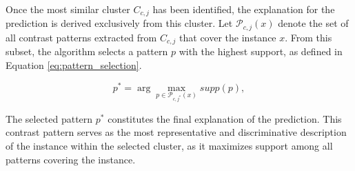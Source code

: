 {       Once the most similar cluster $C_{c,j}$ has been identified, the explanation for the prediction is derived exclusively from this cluster. Let $\mathcal{P}_{c,j}(x)$ denote the set of all contrast patterns extracted from $C_{c,j}$ that cover the instance $x$. From this subset, the algorithm selects a pattern $p$ with the highest support, as defined in Equation \ref{eq:pattern_selection}.
       	
       \begin{equation}
       		p^* = \arg\max_{p \in \mathcal{P}_{c,j^*}(x)} supp(p),
       		\label{eq:pattern_selection}
       	\end{equation}
       	
       The selected pattern $p^*$ constitutes the final explanation of the prediction. This contrast pattern serves as the most representative and discriminative description of the instance within the selected cluster, as it maximizes support among all patterns covering the instance.
    }
